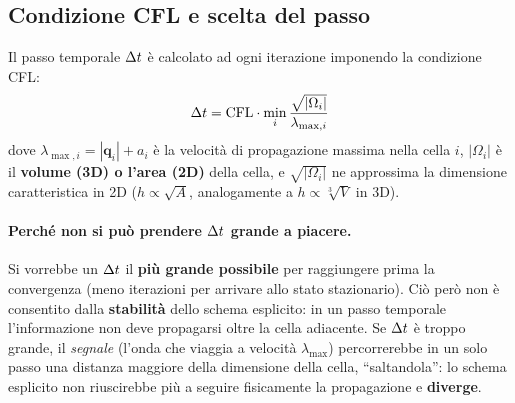 \subsection{Condizione CFL e scelta del passo}

Il passo temporale $\Delta t$ è calcolato ad ogni iterazione imponendo la condizione CFL:
\begin{equation}
  \Delta t = \text{CFL} \cdot \min_i \frac{\sqrt{|\Omega_i|}}{\lambda_{\max,i}}
  \label{eq:cfl}
\end{equation}
dove $\lambda_{\max,i} = |\bm{q}_i| + a_i$ è la velocità di propagazione massima nella
cella $i$, $|\Omega_i|$ è il \textbf{volume (3D) o l'area (2D)} della cella, e
$\sqrt{|\Omega_i|}$ ne approssima la dimensione caratteristica in 2D
($h \propto \sqrt{A}$, analogamente a $h \propto \sqrt[3]{V}$ in 3D).

\paragraph{Perché non si può prendere $\Delta t$ grande a piacere.}
Si vorrebbe un $\Delta t$ il \textbf{più grande possibile} per raggiungere prima la
convergenza (meno iterazioni per arrivare allo stato stazionario). Ciò però non è
consentito dalla \textbf{stabilità} dello schema esplicito: in un passo temporale
l'informazione non deve propagarsi oltre la cella adiacente. Se $\Delta t$ è troppo grande,
il \emph{segnale} (l'onda che viaggia a velocità $\lambda_{\max}$) percorrerebbe in un
solo passo una distanza maggiore della dimensione della cella, ``saltandola'': lo
schema esplicito non riuscirebbe più a seguire fisicamente la propagazione e
\textbf{diverge}.

